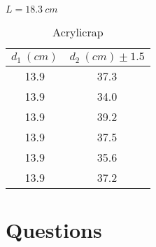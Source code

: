 \documentclass{amsart}
\begin{document}
\begin{table}[H]
\begin{minipage}{0.3\textwidth}
    \end{minipage}
    \begin{minipage}{0.3\textwidth}
        \centering
        \caption{Acrylicrap}
        \vspace{-0.2cm}
        $L = 18.3 \ \unit{cm}$
        \vspace{0.3cm}
        \label{my-label}
        \begin{tabular}{c|c}
        $d_1 \unit{\ (cm)}$            & $d_2 \unit{\ (cm)} \pm 1.5$ \\ \hline
        13.9                       & 37.3                    \\
        13.9                       & 34.0                    \\
        13.9                       & 39.2                    \\
        13.9                       & 37.5                    \\
        13.9                       & 35.6                    \\
        13.9                       & 37.2
        \end{tabular}
    \end{minipage}
\end{table}

%
%
\section{Questions}
\end{document}
